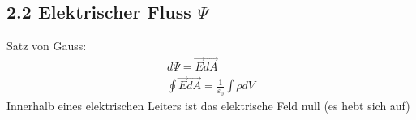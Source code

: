 \subsection*{2.2 Elektrischer Fluss $\Psi$}
    Satz von Gauss:
    \begin{align*}
        d\Psi = \overrightarrow{E} \overrightarrow{dA} \\
        \oint \overrightarrow{E} \overrightarrow{dA} = \frac{1}{\varepsilon_0} \int \rho dV
    \end{align*}
    Innerhalb eines elektrischen Leiters ist das elektrische Feld null (es hebt sich auf)